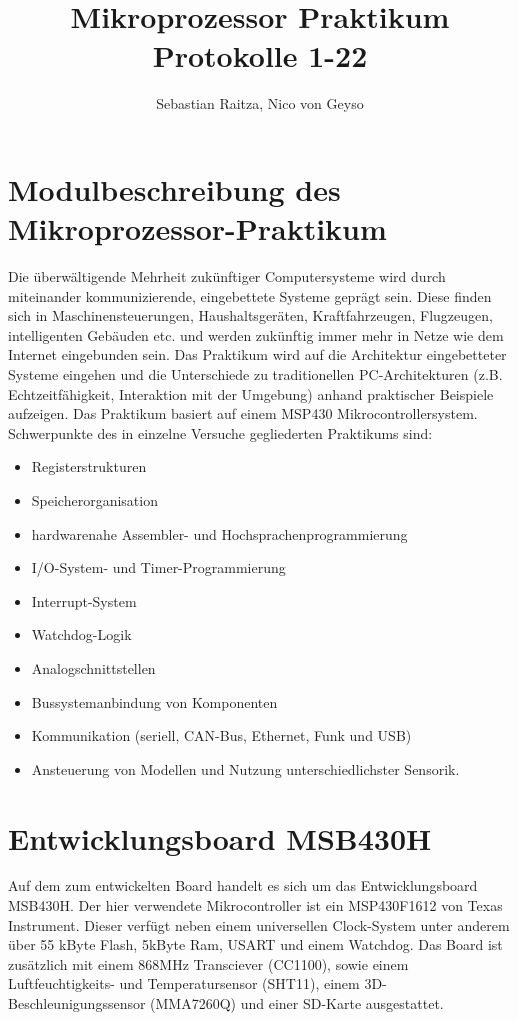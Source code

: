 \documentclass[11pt,german]{scrartcl}
\title{Mikroprozessor Praktikum\\Protokolle 1-22}
\author{Sebastian Raitza, Nico von Geyso}
\begin{document}
\maketitle

\tableofcontents

\section*{Modulbeschreibung des Mikroprozessor-Praktikum}

Die überwältigende Mehrheit zukünftiger Computersysteme wird durch miteinander kommunizierende, eingebettete Systeme geprägt sein.
Diese finden sich in Maschinensteuerungen, Haushaltsgeräten, Kraftfahrzeugen, Flugzeugen, intelligenten Gebäuden etc. und
werden zukünftig immer mehr in Netze wie dem Internet eingebunden sein.
Das Praktikum wird auf die Architektur eingebetteter Systeme eingehen und die Unterschiede zu traditionellen PC-Architekturen
(z.B. Echtzeitfähigkeit, Interaktion mit der Umgebung) anhand praktischer Beispiele aufzeigen.
Das Praktikum basiert auf einem MSP430 Mikrocontrollersystem.
Schwerpunkte des in einzelne Versuche gegliederten Praktikums sind:
\begin{itemize}
    \item Registerstrukturen
    \item Speicherorganisation
    \item hardwarenahe Assembler- und Hochsprachenprogrammierung
    \item I/O-System- und Timer-Programmierung
    \item Interrupt-System
    \item Watchdog-Logik
    \item Analogschnittstellen
    \item Bussystemanbindung von Komponenten
    \item Kommunikation (seriell, CAN-Bus, Ethernet, Funk und USB)
    \item Ansteuerung von Modellen und Nutzung unterschiedlichster Sensorik.
\end{itemize}


\section*{Entwicklungsboard MSB430H}
Auf dem zum entwickelten Board handelt es sich um das Entwicklungsboard MSB430H.
Der hier verwendete Mikrocontroller ist ein MSP430F1612 von Texas Instrument.
Dieser verfügt neben einem universellen Clock-System unter anderem über 55 kByte Flash, 5kByte Ram, USART und einem Watchdog.
Das Board ist zusätzlich mit einem 868MHz Transciever (CC1100),
sowie einem Luftfeuchtigkeits- und Temperatursensor (SHT11), einem 3D-Beschleunigungssensor (MMA7260Q)
und einer SD-Karte ausgestattet.
\end{document}
